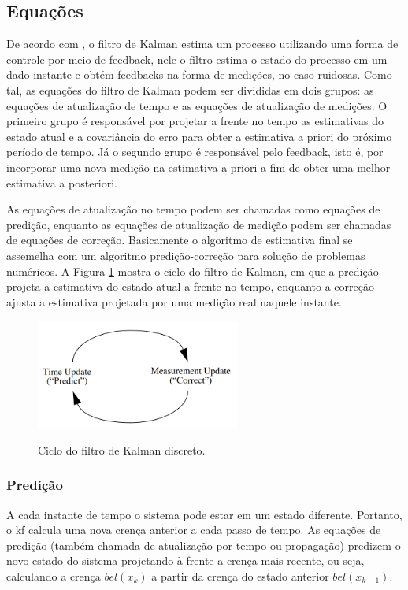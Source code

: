 \documentclass[acronym, symbols, table, deposito]{fei}
\begin{document}
		\subsection{Equações} \label{sec:filtro_de_kalman_equacoes}
			
			De acordo com \textcite{khodarahmi2023review}, o filtro de Kalman estima um processo utilizando uma forma de controle por meio de feedback, nele o filtro estima o estado do processo em um dado instante e obtém feedbacks na forma de medições, no caso ruidosas. Como tal, as equações do filtro de Kalman podem ser divididas em dois grupos: as equações de atualização de tempo e as equações de atualização de medições. O primeiro grupo é responsável por projetar a frente no tempo as estimativas do estado atual e a covariância do erro para obter a estimativa a priori do próximo período de tempo. Já o segundo grupo é responsável pelo feedback, isto é, por incorporar uma nova medição na estimativa a priori a fim de obter uma melhor estimativa a posteriori.
			
			As equações de atualização no tempo podem ser chamadas como equações de predição, enquanto as equações de atualização de medição podem ser chamadas de equações de correção. Basicamente o algoritmo de estimativa final se assemelha com um algoritmo predição-correção para solução de problemas numéricos. A Figura \ref{fig:predicao_atualizacao_kalman} mostra o ciclo do filtro de Kalman, em que a predição projeta a estimativa do estado atual a frente no tempo, enquanto a correção ajusta a estimativa projetada por uma medição real naquele instante.
			
			\begin{figure}[!htb]
				\centering
				\caption{Ciclo do filtro de Kalman discreto.} 
				\includegraphics[width=0.6\textwidth]{predicao_atualizacao_kalman.png}
				\label{fig:predicao_atualizacao_kalman}
			\end{figure}
			
			\subsubsection{Predição}
				A cada instante de tempo o sistema pode estar em um estado diferente. Portanto, o \acrshort{kf} calcula uma nova crença anterior a cada passo de tempo. As equações de predição (também chamada de atualização por tempo ou propagação) predizem o novo estado do sistema projetando à frente a crença mais recente, ou seja, calculando a crença $bel(x_k)$ a partir da crença do estado anterior $bel(x_{k-1})$. 
				
\end{document}
